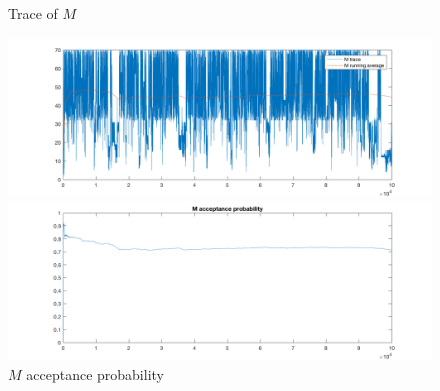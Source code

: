 \documentclass{siamart1116}
\begin{document}
\begin{figure}[!htb]
\begin{minipage}{0.48\textwidth}
    \centering
    \caption{\label{fig:voting_hier_M_trace} Trace of $M$}
    \includegraphics[width=\linewidth]{voting/hier/M_trace.png}
\end{minipage} \hfill
\begin{minipage}{0.48\textwidth}
    \centering
    \caption{\label{fig:voting_hier_M_accept} $M$ acceptance probability}
    \includegraphics[width=\linewidth]{voting/hier/M_accept.png}
\end{minipage}
\end{figure}
\end{document}

